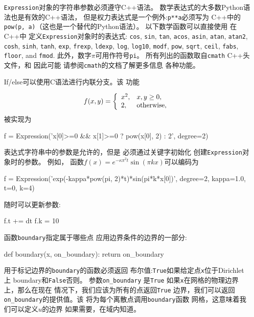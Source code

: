 
\begin{notice}[字符串表达式必须具有有效的C++语法!]
\texttt{Expression}对象的字符串参数必须遵守C++语法。
数学表达式的大多数Python语法也是有效的C++语法，
但是权力表达式是一个例外:\texttt{p**a}必须写为
C++中的\texttt{pow(p, a)}（这也是一个替代的Python语法）。
以下数学函数可以直接使用
在C++中
定义\texttt{Expression}对象时的表达式:
\texttt{cos}, \texttt{sin}, \texttt{tan}, \texttt{acos}, \texttt{asin},
\texttt{atan}, \texttt{atan2}, \texttt{cosh}, \texttt{sinh}, \texttt{tanh}, \texttt{exp},
\texttt{frexp}, \texttt{ldexp}, \texttt{log}, \texttt{log10}, \texttt{modf},
\texttt{pow}, \texttt{sqrt}, \texttt{ceil}, \texttt{fabs}, \texttt{floor}, and \texttt{fmod}.
此外，数字$\pi$可用作符号\texttt{pi}。
所有列出的函数取自\texttt{cmath} C++头文件，和
因此可能
请参阅\texttt{cmath}的文档了解更多信息
各种功能。

If/else可以使用C语法进行内联分支。该
功能

\[ f(x,y) = \left\lbrace\begin{array}{ll} x^2, & x, y\geq 0,\\
2, & \hbox{otherwise},\end{array}\right.\]
被实现为

\begin{python}
f = Expression('x[0]>=0 && x[1]>=0 ? pow(x[0], 2) : 2', degree=2)
\end{python}

表达式字符串中的参数是允许的，但是
必须通过关键字初始化
创建\texttt{Expression}对象时的参数。 例如，
函数$f(x)=e^{-\kappa\pi^2t}\sin(\pi k x)$可以编码为

\begin{python}
f = Expression('exp(-kappa*pow(pi, 2)*t)*sin(pi*k*x[0])', degree=2,
               kappa=1.0, t=0, k=4)
\end{python}
随时可以更新参数:

\begin{python}
f.t += dt
f.k = 10
\end{python}
\end{notice}


函数\texttt{boundary}指定属于哪些点
应用边界条件的边界的一部分:

\begin{python}
def boundary(x, on_boundary):
    return on_boundary
\end{python}
用于标记边界的\texttt{boundary}的函数必须返回
布尔值:\texttt{True}如果给定点\texttt{x}位于Dirichlet上
boundary和\texttt{False}否则。 参数\verb!on_boundary! 是\texttt{True}
如果\texttt{x}在网格的物理边界上，那么在现在
情况下，我们应该为所有的点返回\texttt{True}
边界，我们可以返回\verb!on_boundary!的提供值。该
将为每个离散点调用\texttt{boundary}函数
网格，这意味着我们可以定义$u$的边界
如果需要，在域内知道。

